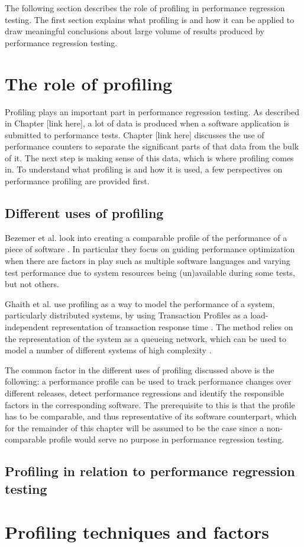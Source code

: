 The following section describes the role of profiling in performance regression testing. The first section explains what profiling is and how it can be applied to draw meaningful conclusions about large volume of results produced by performance regression testing.

\section{The role of profiling}
Profiling plays an important part in performance regression testing. As described in Chapter [link here], a lot of data is produced when a software application is submitted to performance tests. Chapter [link here] discusses the use of performance counters to separate the significant parts of that data from the bulk of it. The next step is making sense of this data, which is where profiling comes in. To understand what profiling is and how it is used, a few perspectives on performance profiling are provided first.

\subsection{Different uses of profiling}
Bezemer et al. look into creating a comparable profile of the performance of a piece of software \cite{io_regressions}. In particular they focus on guiding performance optimization when there are factors in play such as multiple software languages and varying test performance due to system resources being (un)available during some tests, but not others.

Ghaith et al. use profiling as a way to model the performance of a system, particularly distributed systems, by using Transaction Profiles as a load-independent representation of transaction response time \cite{profile_based_detection}. The method relies on the representation of the system as a queueing network, which can be used to model a number of different systems of high complexity \cite{performance_puzzles}.

The common factor in the different uses of profiling discussed above is the following: a performance profile can be used to track performance changes over different releases, detect performance regressions and identify the responsible factors in the corresponding software. The prerequisite to this is that the profile has to be comparable, and thus representative of its software counterpart, which for the remainder of this chapter will be assumed to be the case since a non-comparable profile would serve no purpose in performance regression testing.

\subsection{Profiling in relation to performance regression testing}


\section{Profiling techniques and factors}

